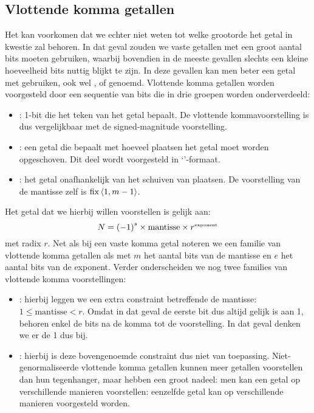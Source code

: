 \subsection{Vlottende komma getallen}
Het kan voorkomen dat we echter niet weten tot welke grootorde het getal in kwestie zal behoren. In dat geval zouden we vaste getallen met een groot aantal bits moeten gebruiken, waarbij bovendien in de meeste gevallen slechts een kleine hoeveelheid bits nuttig blijkt te zijn. In deze gevallen kan men beter een getal met  gebruiken, ook wel ,  of  genoemd. Vlottende komma getallen worden voorgesteld door een sequentie van bits die in drie groepen worden onderverdeeld:
\begin{itemize}
 \item {}: 1-bit die het teken van het getal bepaalt. De vlottende kommavoorstelling is dus vergelijkbaar met de signed-magnitude voorstelling.
 \item {}: een getal die bepaalt met hoeveel plaatsen het getal moet worden opgeschoven. Dit deel wordt voorgesteld in `'-formaat.
 \item {}: het getal onafhankelijk van het schuiven van plaatsen. De voorstelling van de mantisse zelf is $\operatorname{fix}\left<1,m-1\right>$.
\end{itemize}
Het getal dat we hierbij willen voorstellen is gelijk aan:
\begin{equation}
N=\left(-1\right)^s\times\mbox{mantisse}\times r^{\mbox{\tiny{exponent}}}
\end{equation}
met radix $r$. Net als bij een vaste komma getal noteren we een familie van vlottende komma getallen als  met $m$ het aantal bits van de mantisse en $e$ het aantal bits van de exponent. Verder onderscheiden we nog twee families van vlottende komma voorstellingen:
\begin{itemize}
 \item {}: hierbij leggen we een extra constraint betreffende de mantisse: $1\leq\mbox{mantisse}<r$. Omdat in dat geval de eerste bit dus altijd gelijk is aan 1, behoren enkel de bits na de komma tot de voorstelling. In dat geval denken we er de 1 dus bij.
 \item {}: hierbij is deze bovengenoemde constraint dus niet van toepassing. Niet-genormaliseerde vlottende komma getallen kunnen meer getallen voorstellen dan hun tegenhanger, maar hebben een groot nadeel: men kan een getal op verschillende manieren voorstellen: eenzelfde getal kan op verschillende manieren voorgesteld worden.
\end{itemize}
